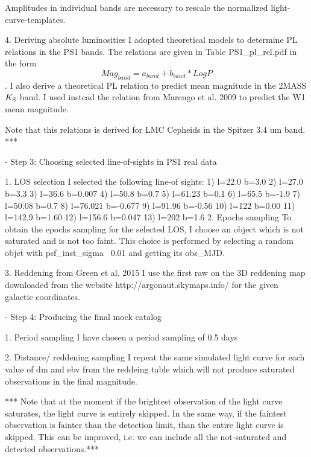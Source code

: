            Amplitudes in individual bands are necessary to rescale the normalized light-curve-templates.


        4. Deriving absolute luminosities 
            I adopted theoretical models to determine PL relations in the PS1 bands.
            The relations are given in Table PS1_pl_rel.pdf in the form 
            $$Mag_{band}= a_{band} + b_{band} * Log P $$.
            I also derive a theoretical PL relation to predict mean magnitude in the 2MASS $K_{\rm{S}}$ band.
            I used instead the relation from Marengo et al. 2009 to predict the W1 mean magnitude.
     
            Note that this relations is derived for LMC Cepheids in the Spitzer 3.4 um band. ***


- Step 3: Choosing selected line-of-sights in PS1 real data
        
        1. LOS selection
                I selected the following line-of sights:
                 1) l=22.0     b=3.0
		2) l=27.0     b=3.3
		3) l=36.6     b=0.007
		4) l=50.8     b=0.7
		5) l=61.23   b=0.1
		6) l=65.5     b=-1.9
		7) l=50.08   b=0.7
		8) l=76.021 b=-0.677
		9) l=91.96   b=-0.56
		10) l=122      b=0.00
		11) l=142.9   b=1.60
		12) l=156.6   b=0.047
		13) l=202      b=1.6                   
        2. Epochs sampling
                To obtain the epochs sampling for the selected LOS, I choose an object which is not saturated and is not too faint.
                This choice is performed by selecting a random objet with psf_inst_sigma ~0.01
                and getting its obs_MJD.
            
        3. Reddening from Green et al. 2015
                I use the first raw on the 3D reddening map downloaded from the website http://argonaut.skymaps.info/ 
                for the given galactic coordinates.
    
        
- Step 4: Producing the final mock catalog
        
        1. Period sampling
            I have chosen a period sampling of 0.5 days
        
        2. Distance/ reddening sampling
                I  repeat the same simulated light curve for each value of  dm and ebv  from the reddeing table
                which will not produce saturated observations in the final magnitude.
        
        *** Note that at the moment if the brightest observation of the light curve saturates, the light curve is entirely skipped. 
        In the same way, if the faintest observation is fainter than the detection limit, than the entire light curve is skipped.
        This can be improved, i.e. we can include all the not-saturated and detected observations.***
        
